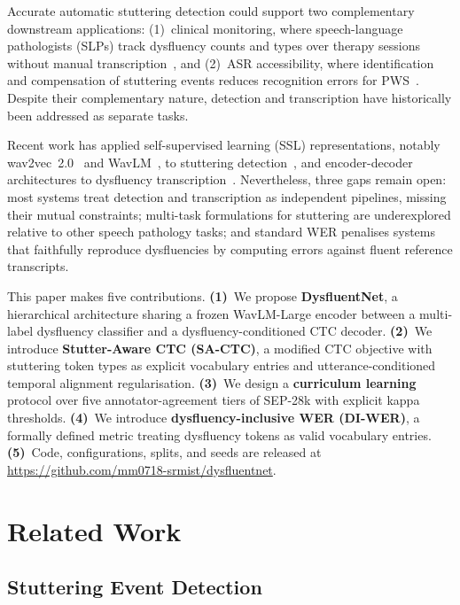 \documentclass[cameraready]{Interspeech}
\begin{document}
Accurate automatic stuttering detection could support two complementary
downstream applications: (1)~clinical monitoring, where speech-language
pathologists (SLPs) track dysfluency counts and types over therapy sessions
without manual transcription~\cite{yaruss2006clinical}, and (2)~ASR
accessibility, where identification and compensation of stuttering events
reduces recognition errors for PWS~\cite{heeman2016clinician}. Despite their
complementary nature, detection and transcription have historically been
addressed as separate tasks.

Recent work has applied self-supervised learning (SSL) representations, notably
wav2vec~2.0~\cite{baevski2020wav2vec} and WavLM~\cite{chen2022wavlm}, to
stuttering detection~\cite{bayerl2022detecting,changawala2024whister}, and
encoder-decoder architectures to dysfluency
transcription~\cite{lian2024ssdm,lian2025ssdm2}. Nevertheless, three gaps
remain open: most systems treat detection and transcription as independent
pipelines, missing their mutual constraints; multi-task formulations for
stuttering are underexplored relative to other speech pathology tasks; and
standard WER penalises systems that faithfully reproduce dysfluencies by
computing errors against fluent reference transcripts.

This paper makes five contributions.
\textbf{(1)}~We propose \textbf{DysfluentNet}, a hierarchical architecture
sharing a frozen WavLM-Large encoder between a multi-label dysfluency
classifier and a dysfluency-conditioned CTC decoder.
\textbf{(2)}~We introduce \textbf{Stutter-Aware CTC (SA-CTC)}, a modified CTC
objective with stuttering token types as explicit vocabulary entries and
utterance-conditioned temporal alignment regularisation.
\textbf{(3)}~We design a \textbf{curriculum learning} protocol over five
annotator-agreement tiers of SEP-28k with explicit kappa thresholds.
\textbf{(4)}~We introduce \textbf{dysfluency-inclusive WER (DI-WER)}, a
formally defined metric treating dysfluency tokens as valid vocabulary entries.
\textbf{(5)}~Code, configurations, splits, and seeds are released at
\url{https://github.com/mm0718-srmist/dysfluentnet}.

\section{Related Work}

\subsection{Stuttering Event Detection}
\end{document}
